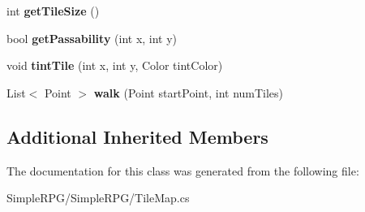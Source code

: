 \begin{DoxyCompactItemize}
\item 
\hypertarget{class_simple_r_p_g_1_1_tile_map_aff60bd6ac7270eaaed3e8a56f65908a0}{int {\bfseries get\-Tile\-Size} ()}\label{class_simple_r_p_g_1_1_tile_map_aff60bd6ac7270eaaed3e8a56f65908a0}

\item 
\hypertarget{class_simple_r_p_g_1_1_tile_map_aae945859439ba8cfacde7e4fa2e66e3d}{bool {\bfseries get\-Passability} (int x, int y)}\label{class_simple_r_p_g_1_1_tile_map_aae945859439ba8cfacde7e4fa2e66e3d}

\item 
\hypertarget{class_simple_r_p_g_1_1_tile_map_a78b7a07964de6deb8526f7cbe0488cbc}{void {\bfseries tint\-Tile} (int x, int y, Color tint\-Color)}\label{class_simple_r_p_g_1_1_tile_map_a78b7a07964de6deb8526f7cbe0488cbc}

\item 
\hypertarget{class_simple_r_p_g_1_1_tile_map_acba2546b228a31be6d7f1c684ab36302}{List$<$ Point $>$ {\bfseries walk} (Point start\-Point, int num\-Tiles)}\label{class_simple_r_p_g_1_1_tile_map_acba2546b228a31be6d7f1c684ab36302}

\end{DoxyCompactItemize}
\subsection*{Additional Inherited Members}


The documentation for this class was generated from the following file\-:\begin{DoxyCompactItemize}
\item 
Simple\-R\-P\-G/\-Simple\-R\-P\-G/Tile\-Map.\-cs\end{DoxyCompactItemize}
